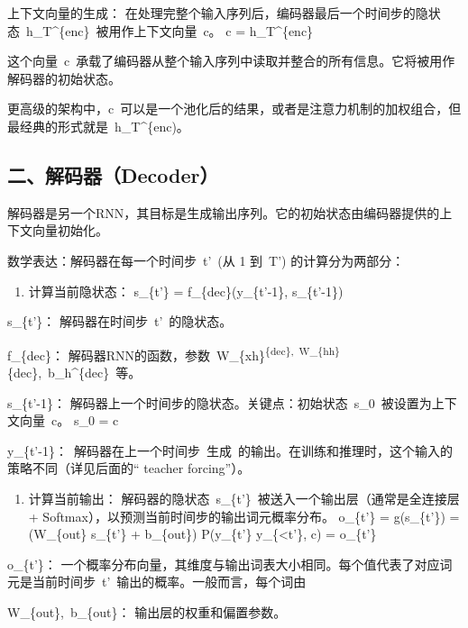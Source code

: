 上下文向量的生成：
在处理完整个输入序列后，编码器最后一个时间步的隐状态~h\_T\^{}\{enc\}~被用作上下文向量~c。
c = h\_T\^{}\{enc\}

这个向量~c~承载了编码器从整个输入序列中读取并整合的所有信息。它将被用作解码器的初始状态。

更高级的架构中，c~可以是一个池化后的结果，或者是注意力机制的加权组合，但最经典的形式就是~h\_T\^{}\{enc)。

\hypertarget{ux4e8cux89e3ux7801ux5668decoder}{%
\subsection{二、解码器（Decoder）}\label{ux4e8cux89e3ux7801ux5668decoder}}

解码器是另一个RNN，其目标是生成输出序列。它的初始状态由编码器提供的上下文向量初始化。

数学表达：解码器在每一个时间步~t'~(从 1 到~T') 的计算分为两部分：

\begin{enumerate}
\def\labelenumi{\alph{enumi})}
\tightlist
\item
  计算当前隐状态：
  s\_\{t'\} = f\_\{dec\}(y\_\{t'-1\}, s\_\{t'-1\})
\end{enumerate}

s\_\{t'\}： 解码器在时间步~t'~的隐状态。

f\_\{dec\}： 解码器RNN的函数，参数~W\_\{xh\}\textsuperscript{\{dec\},~W\_\{hh\}}\{dec\},~b\_h\^{}\{dec\}~等。

s\_\{t'-1\}： 解码器上一个时间步的隐状态。关键点：初始状态~s\_0~被设置为上下文向量~c。
s\_0 = c

y\_\{t'-1\}：~解码器在上一个时间步~生成~的输出。在训练和推理时，这个输入的策略不同（详见后面的`` teacher forcing''）。

\begin{enumerate}
\def\labelenumi{\alph{enumi})}
\setcounter{enumi}{1}
\tightlist
\item
  计算当前输出：
  解码器的隐状态~s\_\{t'\}~被送入一个输出层（通常是全连接层 + Softmax），以预测当前时间步的输出词元概率分布。
  o\_\{t'\} = g(s\_\{t'\}) = (W\_\{out\} s\_\{t'\} + b\_\{out\})
  P(y\_\{t'\} \textbar{} y\_\{\textless t'\}, c) = o\_\{t'\}
\end{enumerate}

o\_\{t'\}： 一个概率分布向量，其维度与输出词表大小相同。每个值代表了对应词元是当前时间步~t'~输出的概率。一般而言，每个词由

W\_\{out\},~b\_\{out\}： 输出层的权重和偏置参数。

